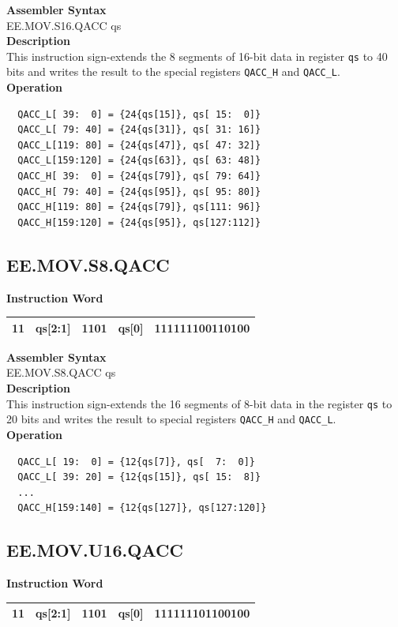 \textbf{Assembler Syntax} \\
EE.MOV.S16.QACC qs \\
\textbf{Description} \\
This instruction sign-extends the 8 segments of 16-bit data in register \lstinline{qs} to 40 bits and writes the result to the special registers \lstinline{QACC_H} and \lstinline{QACC_L}.\\
\textbf{Operation}
\begin{lstlisting}
  QACC_L[ 39:  0] = {24{qs[15]}, qs[ 15:  0]}
  QACC_L[ 79: 40] = {24{qs[31]}, qs[ 31: 16]}
  QACC_L[119: 80] = {24{qs[47]}, qs[ 47: 32]}
  QACC_L[159:120] = {24{qs[63]}, qs[ 63: 48]}
  QACC_H[ 39:  0] = {24{qs[79]}, qs[ 79: 64]}
  QACC_H[ 79: 40] = {24{qs[95]}, qs[ 95: 80]}
  QACC_H[119: 80] = {24{qs[79]}, qs[111: 96]}
  QACC_H[159:120] = {24{qs[95]}, qs[127:112]}
\end{lstlisting}

\clearpage
\subsection{EE.MOV.S8.QACC}\label{instruction:EEMOVS8QACC}
\setlength\tabcolsep{6pt}
\textbf{Instruction Word} \\
\begin{tabular}{|c|c|c|c|c|}
	\hline
	11 & qs[2:1] & 1101 & qs[0] & 111111100110100 \\
	\hline
\end{tabular}

\textbf{Assembler Syntax} \\
EE.MOV.S8.QACC qs \\
\textbf{Description} \\
This instruction sign-extends the 16 segments of 8-bit data in the register \lstinline{qs} to 20 bits and writes the result to special registers \lstinline{QACC_H} and \lstinline{QACC_L}.\\
\textbf{Operation}
\begin{lstlisting}
  QACC_L[ 19:  0] = {12{qs[7]}, qs[  7:  0]}
  QACC_L[ 39: 20] = {12{qs[15]}, qs[ 15:  8]}
  ...
  QACC_H[159:140] = {12{qs[127]}, qs[127:120]}
\end{lstlisting}

\clearpage
\subsection{EE.MOV.U16.QACC}\label{instruction:EEMOVU16QACC}
\setlength\tabcolsep{6pt}
\textbf{Instruction Word} \\
\begin{tabular}{|c|c|c|c|c|}
	\hline
	11 & qs[2:1] & 1101 & qs[0] & 111111101100100 \\
	\hline
\end{tabular}

